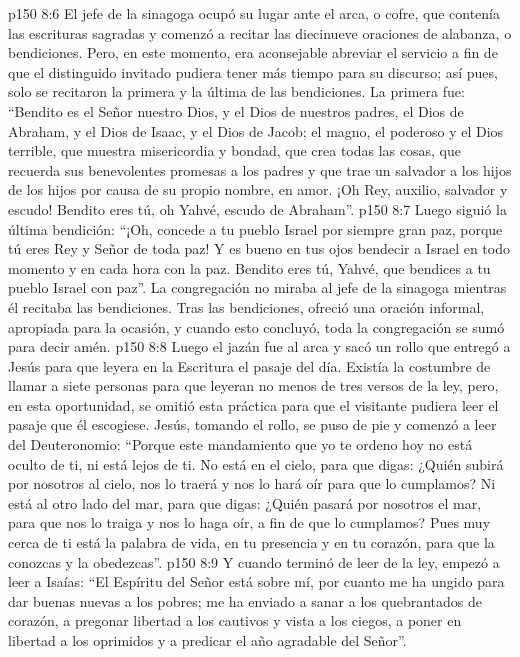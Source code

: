 \vs p150 8:6 El jefe de la sinagoga ocupó su lugar ante el arca, o cofre, que contenía las escrituras sagradas y comenzó a recitar las diecinueve oraciones de alabanza, o bendiciones. Pero, en este momento, era aconsejable abreviar el servicio a fin de que el distinguido invitado pudiera tener más tiempo para su discurso; así pues, solo se recitaron la primera y la última de las bendiciones. La primera fue: “Bendito es el Señor nuestro Dios, y el Dios de nuestros padres, el Dios de Abraham, y el Dios de Isaac, y el Dios de Jacob; el magno, el poderoso y el Dios terrible, que muestra misericordia y bondad, que crea todas las cosas, que recuerda sus benevolentes promesas a los padres y que trae un salvador a los hijos de los hijos por causa de su propio nombre, en amor. ¡Oh Rey, auxilio, salvador y escudo! Bendito eres tú, oh Yahvé, escudo de Abraham”.
\vs p150 8:7 Luego siguió la última bendición: “¡Oh, concede a tu pueblo Israel por siempre gran paz, porque tú eres Rey y Señor de toda paz! Y es bueno en tus ojos bendecir a Israel en todo momento y en cada hora con la paz. Bendito eres tú, Yahvé, que bendices a tu pueblo Israel con paz”. La congregación no miraba al jefe de la sinagoga mientras él recitaba las bendiciones. Tras las bendiciones, ofreció una oración informal, apropiada para la ocasión, y cuando esto concluyó, toda la congregación se sumó para decir amén.
\vs p150 8:8 Luego el jazán fue al arca y sacó un rollo que entregó a Jesús para que leyera en la Escritura el pasaje del día. Existía la costumbre de llamar a siete personas para que leyeran no menos de tres versos de la ley, pero, en esta oportunidad, se omitió esta práctica para que el visitante pudiera leer el pasaje que él escogiese. Jesús, tomando el rollo, se puso de pie y comenzó a leer del Deuteronomio: “Porque este mandamiento que yo te ordeno hoy no está oculto de ti, ni está lejos de ti. No está en el cielo, para que digas: ¿Quién subirá por nosotros al cielo, nos lo traerá y nos lo hará oír para que lo cumplamos? Ni está al otro lado del mar, para que digas: ¿Quién pasará por nosotros el mar, para que nos lo traiga y nos lo haga oír, a fin de que lo cumplamos? Pues muy cerca de ti está la palabra de vida, en tu presencia y en tu corazón, para que la conozcas y la obedezcas”.
\vs p150 8:9 Y cuando terminó de leer de la ley, empezó a leer a Isaías: “El Espíritu del Señor está sobre mí, por cuanto me ha ungido para dar buenas nuevas a los pobres; me ha enviado a sanar a los quebrantados de corazón, a pregonar libertad a los cautivos y vista a los ciegos, a poner en libertad a los oprimidos y a predicar el año agradable del Señor”.
